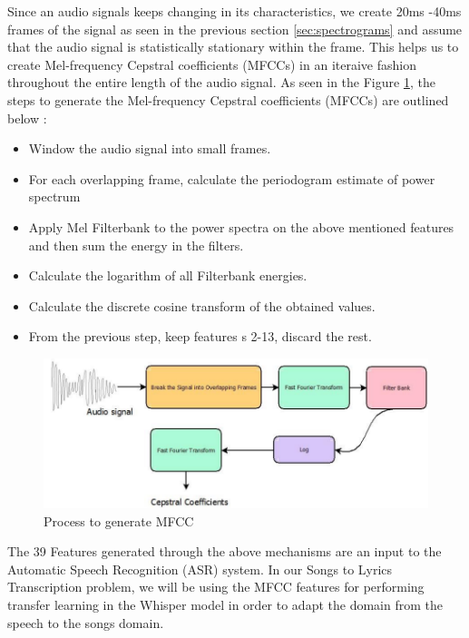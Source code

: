 Since an audio signals keeps changing in its characteristics, we create 20ms -40ms frames of the signal as seen in the previous section \ref{sec:spectrograms} and assume that the audio signal is statistically stationary within the frame. This helps us to create Mel-frequency Cepstral coefficients (MFCCs) in an iteraive fashion throughout the entire length of the audio signal. As seen in the Figure \ref{fig:mfccgeneration}, the steps to generate the Mel-frequency Cepstral coefficients (MFCCs)  are outlined below \cite{huang2001spoken} \cite{song2016detecting}: 
\begin{itemize}
    \item Window the audio signal into small frames. 
    \item For each overlapping frame, calculate the periodogram estimate of power spectrum \cite{song2016detecting}
    \item Apply Mel Filterbank to the power spectra on the above mentioned features and then sum the energy in the filters.
    \item Calculate the logarithm of all Filterbank energies.
    \item Calculate the discrete cosine transform of the obtained values.
    \item From the previous step, keep features s 2-13, discard the rest.
\end{itemize}


\begin{figure}
    \centering
    \includegraphics[width=1.0\textwidth]{03-Theoretical Foundations/figures/mfcc_generation.pdf}
    \caption{Process to generate MFCC}
    \label{fig:mfccgeneration}
\end{figure}


The 39 Features generated through the above mechanisms are an input to the Automatic Speech Recognition (ASR) system. In our Songs to Lyrics Transcription problem, we will be using the MFCC features for performing transfer learning in the Whisper model in order to adapt the domain from the speech to the songs domain.


